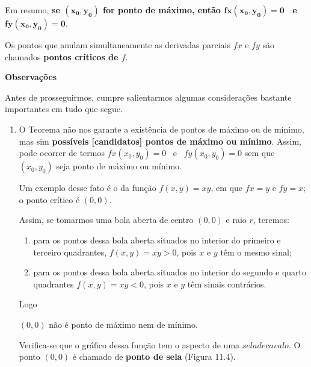 		Em resumo, \textbf{se $\boldsymbol{(x_{0}, y_{0})}$ for ponto de máximo, então $\boldsymbol{fx(x_{0}, y_{0}) = 0}$ \ e \ $\boldsymbol{fy(x_{0}, y_{0}) = 0}$}.

		Os pontos que anulam simultaneamente as derivadas parciais $fx$ e $fy$ são chamados \textbf{pontos críticos de $f$}.

		\bigskip

		\textbf{Observações}

		\medskip

		Antes de prosseguirmos, cumpre salientarmos algumas considerações bastante importantes em tudo que segue.

		\begin{enumerate}[label=(\roman*)]

			\item O Teorema não nos garante a existência de pontos de máximo ou de mínimo, mas sim \textbf{possíveis [candidatos] pontos de máximo ou mínimo}. Assim, pode ocorrer de termos $fx(x_{0}, y_{0}) = 0$ \ e \ $fy(x_{0}, y_{0}) = 0$ sem que $(x_{0}, y_{0})$ seja ponto de máximo ou mínimo.

			Um exemplo desse fato é o da função $f(x, y) = xy$, em que $fx = y$ e $fy = x$; o ponto crítico é $(0, 0)$.

			Assim, se tomarmos uma bola aberta de centro $(0, 0)$ e raio $r$, teremos:

			\begin{enumerate}[label=\alph*)]

				\item para os pontos dessa bola aberta situados no interior do primeiro e terceiro quadrantes, $f(x, y) = xy > 0$, pois $x$ e $y$ têm o mesmo sinal;

				\item para os pontos dessa bola aberta situados no interior do segundo e quarto quadrantes $f(x, y) = xy < 0$, pois $x$ e $y$ têm sinais contrários.

			\end{enumerate}

			Logo

			\medskip

			$(0,0)$ não é ponto de máximo nem de mínimo.

			\medskip

			Verifica-se que o gráfico dessa função tem o aspecto de uma $sela de cavalo$. O ponto $(0, 0)$ é chamado de \textbf{ponto de sela} (Figura 11.4).


\end{enumerate}
